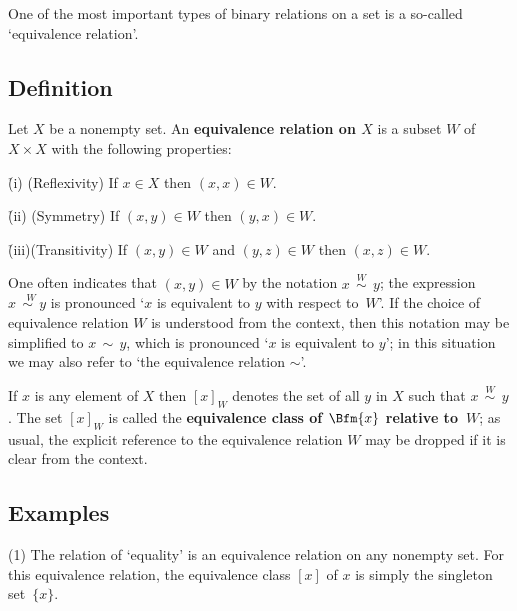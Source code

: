 {\V
\V

        One of the most important types of binary relations on a set is a so-called `equivalence relation'.

\V


        \subsection{\small{{\bf Definition}}}

        Let $X$ be a nonempty set.
    An {\bf equivalence relation on $X$} is a subset $W$ of $X{\times}X$ with the following properties:

        \h (i) (Reflexivity) If $x{\in}X$ then $(x,x){\in}W$.

\V

        \h (ii) (Symmetry) If $(x,y){\in}W$ then $(y,x){\in}W$.

\V

        \h (iii)(Transitivity) If $(x,y){\in}W$ and $(y,z){\in}W$ then $(x,z){\in}W$.

\V

        One often indicates that $(x,y){\in}W$ by the notation $x \stackrel{W}{\,\sim\,}y$;
    the expression  $x\stackrel{W}{\,\sim\,y}$ is pronounced `$x$ is equivalent to $y$ with respect to~$W$'.
    If the choice of equivalence relation $W$ is understood from the context, then this notation may be simplified to $x\,{\sim}\,y$,
    which is pronounced `$x$ is equivalent to $y$'; in this situation we may also refer to `the equivalence relation ${\sim}$'.

        If $x$ is any element of $X$ then $[x]_{W}$ denotes the set of all $y$ in $X$ such that $x \stackrel{W}{\,\sim\,}y$.
    The set $[x]_{W}$ is called the {\bf equivalence class of $\Bfm{x}$ relative to~$W$};
    as usual, the explicit reference to the equivalence relation $W$ may be dropped if it is clear from the context.


        \subsection{\small{{\bf Examples}}}
        \label{ExampA50.100}

\hspace*{\parindent}
        (1) The relation of `equality' is an equivalence relation on any nonempty set.
    For this equivalence relation, the equivalence class $[x]$ of $x$ is simply the singleton set~$\{x\}$.

}
